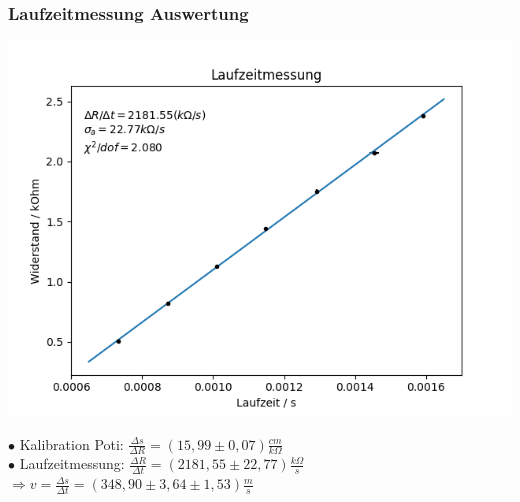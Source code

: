 \documentclass[11pt]{beamer}
\begin{document}
	\begin{frame}
		\frametitle{Laufzeitmessung \qquad Auswertung}
		\begin{center}
			\includegraphics[width=0.6\linewidth]{fit_laufzeit}
		\end{center}
		$\bullet$ Kalibration Poti: $\frac{\Delta s}{\Delta R} = (15,99 \pm 0,07) \frac{cm}{k\Omega}$\\[0.4cm]
		$\bullet$ Laufzeitmessung: $\frac{\Delta R}{\Delta t} = (2181,55 \pm 22,77) \frac{k\Omega}{s}$\\[0.4cm]
		$\Rightarrow v = \frac{\Delta s}{\Delta t} = (348,90 \pm 3,64 \pm 1,53) \frac{m}{s}$
	\end{frame}
\end{document}
